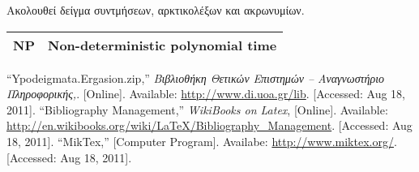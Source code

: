 \documentclass[english]{dithesis} %
\begin{document}
\begin{thesisabbreviations}
Ακολουθεί δείγμα συντμήσεων, αρκτικολέξων και ακρωνυμίων.

\begin{tabularx}{\textwidth}{|X|X|}
  \hline
  NP & Non-deterministic polynomial time \\
  \hline
\end{tabularx}

\end{thesisabbreviations}

\begin{thesisbibliography}{99}
  ``Ypodeigmata.Ergasion.zip,''
  \textit{Βιβλιοθήκη Θετικών Επιστημών -- Αναγνωστήριο Πληροφορικής,}.
  [Online].
  Available: \url{http://www.di.uoa.gr/lib}.
  [Accessed: Aug 18, 2011].
  ``Bibliography Management,''
  \textit{WikiBooks on Latex},
  [Online].
  Available: \url{http://en.wikibooks.org/wiki/LaTeX/Bibliography_Management}.
  [Accessed: Aug 18, 2011].
  ``MikTex,''
  [Computer Program]. Availabe: \url{http://www.miktex.org/}.
  [Accessed: Aug 18, 2011].
\end{thesisbibliography}
\end{document}
